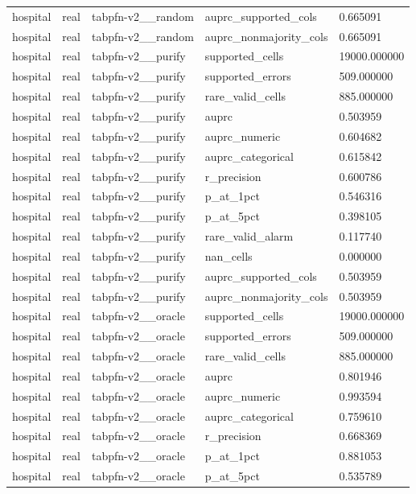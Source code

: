 \begin{tabular}{lllll}
hospital & real & tabpfn-v2\_\_random & auprc\_supported\_cols & 0.665091 \\
hospital & real & tabpfn-v2\_\_random & auprc\_nonmajority\_cols & 0.665091 \\
hospital & real & tabpfn-v2\_\_purify & supported\_cells & 19000.000000 \\
hospital & real & tabpfn-v2\_\_purify & supported\_errors & 509.000000 \\
hospital & real & tabpfn-v2\_\_purify & rare\_valid\_cells & 885.000000 \\
hospital & real & tabpfn-v2\_\_purify & auprc & 0.503959 \\
hospital & real & tabpfn-v2\_\_purify & auprc\_numeric & 0.604682 \\
hospital & real & tabpfn-v2\_\_purify & auprc\_categorical & 0.615842 \\
hospital & real & tabpfn-v2\_\_purify & r\_precision & 0.600786 \\
hospital & real & tabpfn-v2\_\_purify & p\_at\_1pct & 0.546316 \\
hospital & real & tabpfn-v2\_\_purify & p\_at\_5pct & 0.398105 \\
hospital & real & tabpfn-v2\_\_purify & rare\_valid\_alarm & 0.117740 \\
hospital & real & tabpfn-v2\_\_purify & nan\_cells & 0.000000 \\
hospital & real & tabpfn-v2\_\_purify & auprc\_supported\_cols & 0.503959 \\
hospital & real & tabpfn-v2\_\_purify & auprc\_nonmajority\_cols & 0.503959 \\
hospital & real & tabpfn-v2\_\_oracle & supported\_cells & 19000.000000 \\
hospital & real & tabpfn-v2\_\_oracle & supported\_errors & 509.000000 \\
hospital & real & tabpfn-v2\_\_oracle & rare\_valid\_cells & 885.000000 \\
hospital & real & tabpfn-v2\_\_oracle & auprc & 0.801946 \\
hospital & real & tabpfn-v2\_\_oracle & auprc\_numeric & 0.993594 \\
hospital & real & tabpfn-v2\_\_oracle & auprc\_categorical & 0.759610 \\
hospital & real & tabpfn-v2\_\_oracle & r\_precision & 0.668369 \\
hospital & real & tabpfn-v2\_\_oracle & p\_at\_1pct & 0.881053 \\
hospital & real & tabpfn-v2\_\_oracle & p\_at\_5pct & 0.535789 \\

\end{tabular}
